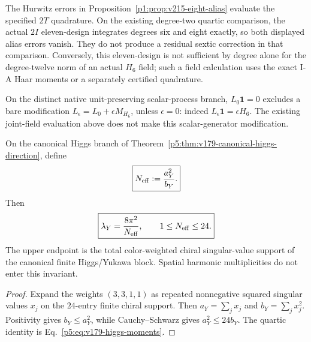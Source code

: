 \documentclass[12pt,a4paper]{article}
\begin{document}
\begin{remark}
The Hurwitz errors in
Proposition~\ref{p1:prop:v215-eight-alias} evaluate the specified
\(2T\) quadrature. On the existing degree-two quartic comparison,
the actual \(2I\) eleven-design integrates degrees six and eight
exactly, so both displayed alias errors vanish. They do not produce a
residual sextic correction in that comparison. Conversely, this
eleven-design is not sufficient by degree alone for the degree-twelve
norm of an actual \(H_6\) field; such a field calculation uses the
exact I-A Haar moments or a separately certified quadrature.

On the distinct native unit-preserving scalar-process branch,
\(L_0\mathbf1=0\) excludes a bare modification
\(L_\epsilon=L_0+\epsilon M_{H_6}\), unless \(\epsilon=0\): indeed
\(L_\epsilon\mathbf1=\epsilon H_6\). The existing joint-field
evaluation above does not make this scalar-generator modification.
\end{remark}




\begin{corollary}
\label{p5:cor:v181-yukawa-participation-invariant}
On the canonical Higgs branch of
Theorem~\ref{p5:thm:v179-canonical-higgs-direction}, define
\[
 \boxed{N_{\rm eff}:=\frac{a_Y^2}{b_Y}.}
\]
Then
\[
 \boxed{\lambda_Y=\frac{8\pi^2}{N_{\rm eff}},\qquad 1\le N_{\rm eff}\le24.}
\]
The upper endpoint is the total color-weighted chiral singular-value support
of the canonical finite Higgs/Yukawa block.  Spatial harmonic multiplicities
do not enter this invariant.
\end{corollary}
\begin{proof}
Expand the weights $(3,3,1,1)$ as repeated nonnegative squared singular
values $x_j$ on the $24$-entry finite chiral support.  Then
$a_Y=\sum_jx_j$ and $b_Y=\sum_jx_j^2$.  Positivity gives
$b_Y\le a_Y^2$, while Cauchy--Schwarz gives $a_Y^2\le24b_Y$.
The quartic identity is Eq.~\eqref{p5:eq:v179-higgs-moments}.
\end{proof}
\end{document}
